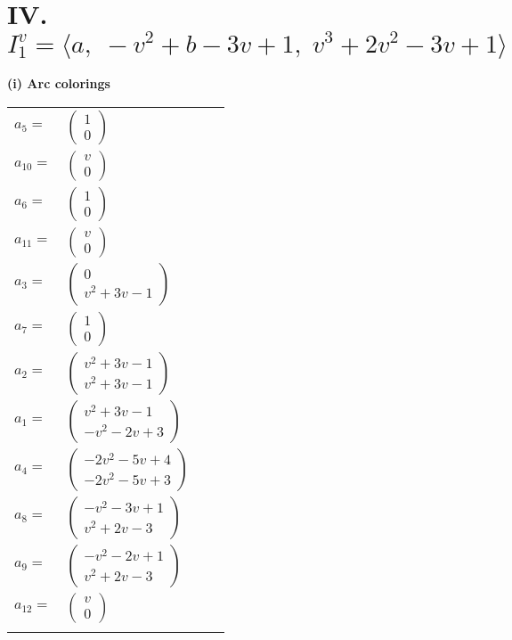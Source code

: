 \documentclass[1p]{elsarticle_modified}
\theoremstyle{definition}
\begin{document}
\centering \section*{IV. $I^v_{1}= \langle a,\;- v^2+b-3 v+1,\;v^3+2 v^2-3 v+1 \rangle$}
\flushleft \textbf{(i) Arc colorings}\\
\begin{tabular}{m{7pt} m{180pt} m{7pt} m{180pt} }
\flushright $a_{5}=$&$\begin{pmatrix}1\\0\end{pmatrix}$ \\
\flushright $a_{10}=$&$\begin{pmatrix}v\\0\end{pmatrix}$ \\
\flushright $a_{6}=$&$\begin{pmatrix}1\\0\end{pmatrix}$ \\
\flushright $a_{11}=$&$\begin{pmatrix}v\\0\end{pmatrix}$ \\
\flushright $a_{3}=$&$\begin{pmatrix}0\\v^2+3 v-1\end{pmatrix}$ \\
\flushright $a_{7}=$&$\begin{pmatrix}1\\0\end{pmatrix}$ \\
\flushright $a_{2}=$&$\begin{pmatrix}v^2+3 v-1\\v^2+3 v-1\end{pmatrix}$ \\
\flushright $a_{1}=$&$\begin{pmatrix}v^2+3 v-1\\- v^2-2 v+3\end{pmatrix}$ \\
\flushright $a_{4}=$&$\begin{pmatrix}-2 v^2-5 v+4\\-2 v^2-5 v+3\end{pmatrix}$ \\
\flushright $a_{8}=$&$\begin{pmatrix}- v^2-3 v+1\\v^2+2 v-3\end{pmatrix}$ \\
\flushright $a_{9}=$&$\begin{pmatrix}- v^2-2 v+1\\v^2+2 v-3\end{pmatrix}$ \\
\flushright $a_{12}=$&$\begin{pmatrix}v\\0\end{pmatrix}$\\&\end{tabular}
\end{document}
